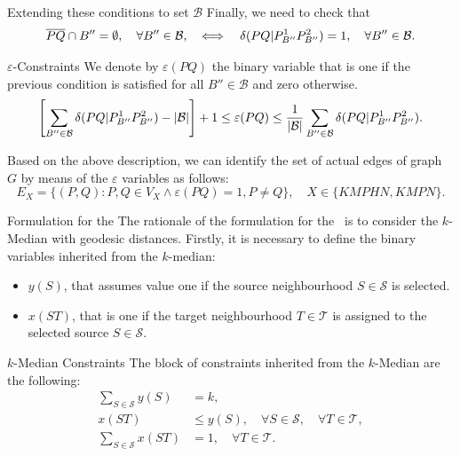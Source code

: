 \documentclass[slidestop,usepdftitle=false,10pt]{beamer}
\newcommand{\KMPN}{{\sf{H-KMPN}\xspace }}
\newcommand{\B}{{\mathcal B}}
\begin{document}
	\newcommand{\varepsilonvar}[2]{\varepsilon(#1#2)}
	
	\begin{frame}{Extending these conditions to set $\mathcal B$}
		\footnotesize
		Finally, we need to check that
		$$\overline{PQ}\cap B''=\emptyset,\quad \forall B''\in\B,\quad\Longleftrightarrow\quad \deltacheck{P}{Q}{P_{B''}^1}{P_{B''}^2}=1,\quad\forall B''\in\B.$$
		\begin{block}{$\varepsilon$-Constraints}
			 We denote by $\varepsilonvar{P}{Q}$ the binary variable that is one if the previous condition is satisfied for all $B''\in\B$ and zero otherwise.
			\begin{equation*}\label{eq:varepsilonC}
				\left[\sum_{B''\in\mathcal B}\deltacheck{P}{Q}{P^1_{B''}}{P^2_{B''}}-|\mathcal B|\right] + 1\leq \varepsilonvar{P}{Q}\leq \frac{1}{|\B|}\sum_{B''\in\mathcal B}\deltacheck{P}{Q}{P^1_{B''}}{P^2_{B''}}.
			\end{equation*}
		\end{block}
		Based on the above description, we can identify the set of actual edges of graph $G$ by means of the $\varepsilon$ variables as follows:
		$$ E_X = \{(P, Q):P,Q\in V_X\wedge\varepsilonvar{P}{Q}=1, P\neq Q\}, \quad X\in \{KMPHN,KMPN\}.$$	
	\end{frame}

	\newcommand{\yvar}[2]{y(#1#2)}
	\newcommand{\gvar}[2]{g(#1#2)}
	
	\begin{frame}{Formulation for the \KMPN}
		\small
		The rationale of the formulation for the \KMPN \ is to consider the $k$-Median with geodesic distances.
		Firstly, it is necessary to define the binary variables inherited from the $k$-median:
		\begin{itemize}
			\item $y(S)$, that assumes value one if the source neighbourhood $S\in\mathcal S$ is selected.
			\item $x(ST)$, that is one if the target neighbourhood $T\in\mathcal T$ is assigned to the selected source $S\in\mathcal S$.
		\end{itemize}
		
		\begin{block}{$k$-Median Constraints}
		The block of constraints inherited from the $k$-Median are the following:
		\begin{align*}
			\sum_{S\in\mathcal S}y(S)&=k,\\
			x(ST)&\leq y(S),\quad\forall S\in\mathcal S,\quad\forall T\in\mathcal T,\\
			\sum_{S\in\mathcal S} x(ST)&=1,\quad\forall T\in\mathcal T.
		\end{align*}
		\end{block}
	\end{frame}
	
\end{document}
